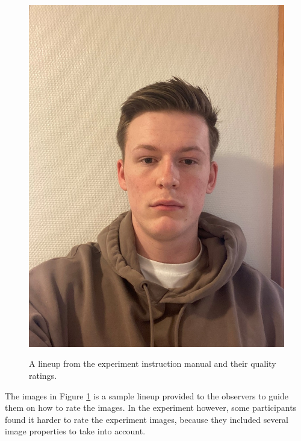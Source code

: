 \begin{figure}[h]
        {\includegraphics[scale = 0.0825]{figures/lineup5.png}}
    \caption{A lineup from the experiment instruction manual and their quality ratings.}
    \label{fig:example-manual}
\end{figure}

The images in Figure \ref{fig:example-manual} is a sample lineup provided to the observers to guide them on how to rate the images. In the experiment however, some participants found it harder to rate the experiment images, because they included several image properties to take into account.

